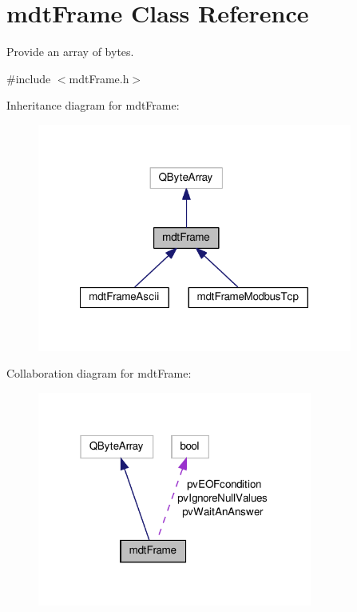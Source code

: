 \hypertarget{classmdt_frame}{\section{mdt\-Frame Class Reference}
\label{classmdt_frame}
}


Provide an array of bytes.  




{\ttfamily \#include $<$mdt\-Frame.\-h$>$}



Inheritance diagram for mdt\-Frame\-:\nopagebreak
\begin{figure}[H]
\begin{center}
\leavevmode
\includegraphics[width=293pt]{classmdt_frame__inherit__graph}
\end{center}
\end{figure}


Collaboration diagram for mdt\-Frame\-:\nopagebreak
\begin{figure}[H]
\begin{center}
\leavevmode
\includegraphics[width=256pt]{classmdt_frame__coll__graph}
\end{center}
\end{figure}
